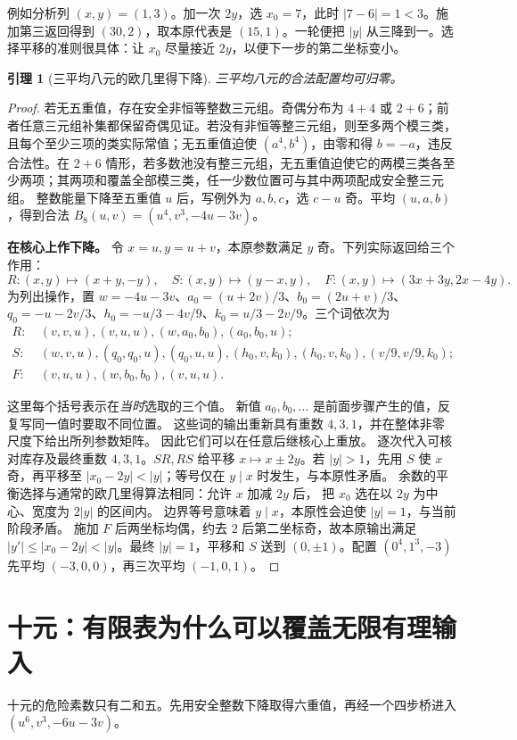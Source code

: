 \documentclass[11pt,a4paper,oneside,openany]{book}
\newtheorem{lemma}[theorem]{引理}
\theoremstyle{definition}
\numberwithin{equation}{chapter}
\begin{document}
例如分析列 $(x,y)=(1,3)$。加一次 $2y$，选 $x_0=7$，此时 $|7-6|=1<3$。施加第三返回得到 $(30,2)$，取本原代表是 $(15,1)$。一轮便把 $|y|$ 从三降到一。选择平移的准则很具体：让 $x_0$ 尽量接近 $2y$，以便下一步的第二坐标变小。
\begin{lemma}[三平均八元的欧几里得下降]\label{lem:eight}
三平均八元的合法配置均可归零。
\end{lemma}
\begin{proof}
若无五重值，存在安全非恒等整数三元组。奇偶分布为 $4+4$ 或 $2+6$；前者任意三元组补集都保留奇偶见证。若没有非恒等整三元组，则至多两个模三类，且每个至少三项的类实际常值；无五重值迫使 $(a^4,b^4)$，由零和得 $b=-a$，违反合法性。在 $2+6$ 情形，若多数池没有整三元组，无五重值迫使它的两模三类各至少两项；其两项和覆盖全部模三类，任一少数位置可与其中两项配成安全整三元组。
整数能量下降至五重值 $u$ 后，写例外为 $a,b,c$，选 $c-u$ 奇。平均 $(u,a,b)$，得到合法 $B_8(u,v)=(u^4,v^3,-4u-3v)$。

\par\noindent\textbf{在核心上作下降。}
令 $x=u,y=u+v$，本原参数满足 $y$ 奇。下列实际返回给三个作用：
\[
R:(x,y)\mapsto(x+y,-y),\quad
S:(x,y)\mapsto(y-x,y),\quad
F:(x,y)\mapsto(3x+3y,2x-4y).
\]
为列出操作，置 $w=-4u-3v$、$a_0=(u+2v)/3$、$b_0=(2u+v)/3$、$q_0=-u-2v/3$、$h_0=-u/3-4v/9$、$k_0=u/3-2v/9$。三个词依次为
\begin{align*}
R:&\ (v,v,u),(v,u,u),(w,a_0,b_0),(a_0,b_0,u);\\
S:&\ (w,v,u),(q_0,q_0,u),(q_0,u,u),
(h_0,v,k_0),(h_0,v,k_0),(v/9,v/9,k_0);\\
F:&\ (v,u,u),(w,b_0,b_0),(v,u,u).
\end{align*}

这里每个括号表示在\emph{当时}选取的三个值。
新值 $a_0,b_0,\ldots$ 是前面步骤产生的值，反复写同一值时要取不同位置。
这些词的输出重新具有重数 $4,3,1$，并在整体非零尺度下给出所列参数矩阵。
因此它们可以在任意后继核心上重放。
逐次代入可核对库存及最终重数 $4,3,1$。$SR,RS$ 给平移 $x\mapsto x\pm2y$。若 $|y|>1$，先用 $S$ 使 $x$ 奇，再平移至 $|x_0-2y|<|y|$；等号仅在 $y\mid x$ 时发生，与本原性矛盾。
余数的平衡选择与通常的欧几里得算法相同：允许 $x$ 加减 $2y$ 后，
把 $x_0$ 选在以 $2y$ 为中心、宽度为 $2|y|$ 的区间内。
边界等号意味着 $y\mid x$，本原性会迫使 $|y|=1$，与当前阶段矛盾。
施加 $F$ 后两坐标均偶，约去 $2$ 后第二坐标奇，故本原输出满足 $|y'|\le|x_0-2y|<|y|$。最终 $|y|=1$，平移和 $S$ 送到 $(0,\pm1)$。配置 $(0^4,1^3,-3)$ 先平均 $(-3,0,0)$，再三次平均 $(-1,0,1)$。
\end{proof}

\section{十元：有限表为什么可以覆盖无限有理输入}
十元的危险素数只有二和五。先用安全整数下降取得六重值，再经一个四步桥进入 $(u^6,v^3,-6u-3v)$。
\end{document}
